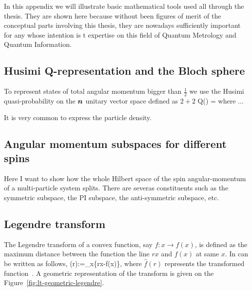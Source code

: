 In this appendix we will illustrate basic mathematical tools used all through the thesis.
They are shown here because without been figures of merit of the conceptual parts involving this thesis, they are nowadays sufficiently important for any whose intention is t expertise on this field of Quantum Metrology and Quantum Information.

\subsection{Husimi Q-representation and the Bloch sphere}

To represent states of total angular momentum bigger than $\frac{1}{2}$ we use the Husimi quasi-probability on the $\boldsymbol{n}$ unitary vector space defined as $2+2$
\be
  Q(\alpha) = \braopket{}{\varrho}{\alpha}
\ee
where ...

It is very common to express the particle density.

\subsection{Angular momentum subspaces for different spins}
\label{app:angular-subspaces}

Here I want to show how the whole Hilbert space of the spin angular-momentum of a multi-particle system splits. There are severas constituents such as the symmetric subspace, the PI subspace, the anti-symmetric subspace, etc.

\subsection{Legendre transform}
\label{app:legendre-transform}

The Legendre transform of a convex function, say $f:x \rightarrow f(x)$, is defined as the maximum distance between the function the line $rx$ and $f(x)$ at same $x$.
In can be written as follows,
\be
  (r):=\max_{x}\{rx-f(x)\},
\ee
where $\hat{f}(r)$ represents the transformed function~\citep{Rockafellar1996}.
A geometric representation of the transform is given on the Figure~\ref{fig:lt-geometric-legendre}.

